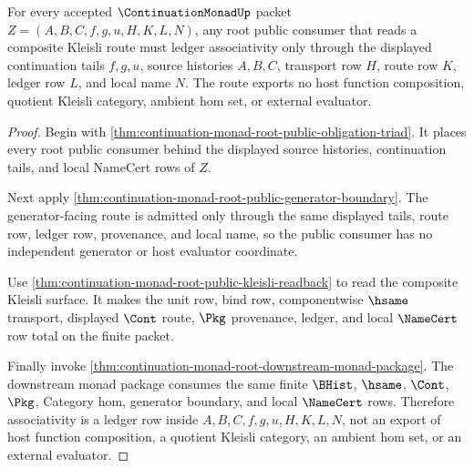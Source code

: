 \begin{theorem}
\label{thm:continuation-monad-root-cont-associativity-ledger}
For every accepted $\ContinuationMonadUp$ packet
$Z=(A,B,C,f,g,u,H,K,L,N)$, any root public consumer that reads a composite
Kleisli route must ledger associativity only through the displayed
continuation tails $f,g,u$, source histories $A,B,C$, transport row $H$,
route row $K$, ledger row $L$, and local name $N$. The route exports no host
function composition, quotient Kleisli category, ambient hom set, or external
evaluator.
\end{theorem}
\begin{proof}
Begin with \autoref{thm:continuation-monad-root-public-obligation-triad}. It
places every root public consumer behind the displayed source histories,
continuation tails, and local NameCert rows of $Z$.

Next apply \autoref{thm:continuation-monad-root-public-generator-boundary}. The
generator-facing route is admitted only through the same displayed tails,
route row, ledger row, provenance, and local name, so the public consumer has
no independent generator or host evaluator coordinate.

Use \autoref{thm:continuation-monad-root-public-kleisli-readback} to read the
composite Kleisli surface. It makes the unit row, bind row, componentwise
$\hsame$ transport, displayed $\Cont$ route, $\Pkg$ provenance, ledger, and
local $\NameCert$ row total on the finite packet.

Finally invoke \autoref{thm:continuation-monad-root-downstream-monad-package}.
The downstream monad package consumes the same finite $\BHist$, $\hsame$,
$\Cont$, $\Pkg$, Category hom, generator boundary, and local $\NameCert$ rows.
Therefore associativity is a ledger row inside $A,B,C,f,g,u,H,K,L,N$, not an
export of host function composition, a quotient Kleisli category, an ambient
hom set, or an external evaluator.
\end{proof}

